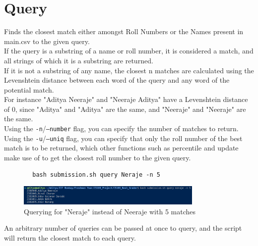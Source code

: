 \documentclass{article}
\begin{document}
    \section{Query}
    Finds the closest match either amongst Roll Numbers or the Names present in main.csv to the given query.\\
    If the query is a substring of a name or roll number, it is considered a match, and all strings of which it is a substring are returned.\\
    If it is not a substring of any name, the closest n matches are calculated using the Levenshtein distance between each word of the query and any word of the potential match.\\
    For instance "Aditya Neeraje" and "Neeraje Aditya" have a Levenshtein distance of 0, since "Aditya" and "Aditya" are the same, and "Neeraje" and "Neeraje" are the same.\\
    Using the \texttt{-n}/\texttt{--number} flag, you can specify the number of matches to return.\\
    Using the \texttt{-u}/\texttt{--uniq} flag, you can specify that only the roll number of the best match is to be returned, which other functions such as percentile and update make use of to get the closest roll number to the given query.\\
    \begin{lstlisting}
        bash submission.sh query Neraje -n 5
    \end{lstlisting}
    \begin{figure}[htbp]
        \centering
        \includegraphics[width=0.8\textwidth]{Query Neraje.png}
        \caption{Querying for "Neraje" instead of Neeraje with 5 matches}
        \label{fig:query}
    \end{figure}
    An arbitrary number of queries can be passed at once to query, and the script will return the closest match to each query.\\
\end{document}
